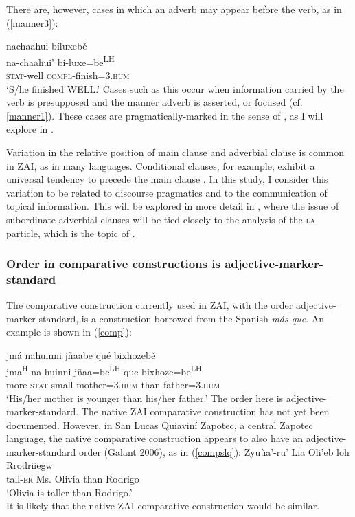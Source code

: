 There are, however, cases in which an adverb may appear before the verb, as in (\ref{manner3}):

\ea\label{manner3}
\glll nachaahui b\'{i}luxeb\v{e} \\
na-chaahui' bi-luxe=be\textsuperscript{LH} \\
\textsc{stat}-well \textsc{compl}-finish=\textsc{3.hum} \\
\glt `S/he finished WELL.'
\z
Cases such as this occur when information carried by the verb is presupposed and the manner adverb is asserted, or focused (cf. \ref{manner1}). These cases are pragmatically-marked in the sense of \citet{payne1995}, as I will explore in .

Variation in the relative position of main clause and adverbial clause is common in ZAI, as in many languages. Conditional clauses, for example, exhibit a universal tendency to precede the main clause \citep{haiman1978}. In this study, I consider this variation to be related to discourse pragmatics and to the communication of topical information. This will be explored in more detail in , where the issue of subordinate adverbial clauses will be tied closely to the analysis of the \textsc{la} particle, which is the topic of .


\subsubsection{Order in comparative constructions is adjective-marker-standard}

The comparative construction currently used in ZAI, with the order adjective-marker-standard, is a construction borrowed from the Spanish \textit{m\'{a}s que}. An example is shown in (\ref{comp}):

\ea\label{comp}
\glll jm\'{a} nahuinni jñaabe qu\'{e} bixhozeb\v{e} \\
jma\textsuperscript{H} na-huinni jñaa=be\textsuperscript{LH} que bixhoze=be\textsuperscript{LH} \\
more \textsc{stat}-small mother=\textsc{3.hum} than father=\textsc{3.hum} \\
\glt `His/her mother is younger than his/her father.'
\z
The order here is adjective-marker-standard. The native ZAI comparative construction has not yet been documented. However, in San Lucas Quiavin\'{i} Zapotec, a central Zapotec language, the native comparative construction appears to also have an adjective-marker-standard order (Galant 2006), as in (\ref{compslq}):
\ea\label{compslq}
\gll Zyu\`{u}a'-ru' Lia Oli'eb loh Rrodriiegw \\
tall-\textsc{er} Ms. Olivia than Rodrigo \\
\glt `Olivia is taller than Rodrigo.' \\
\z
It is likely that the native ZAI comparative construction would be similar.



